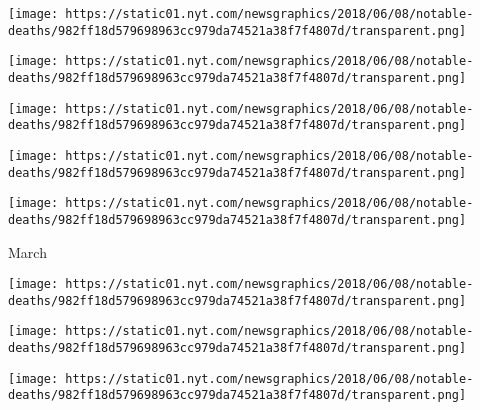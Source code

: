 \href{https://www.nytimes.com/2018/04/06/us/former-senator-daniel-akaka-dead.html}{}

\texttt{[image: https://static01.nyt.com/newsgraphics/2018/06/08/notable-deaths/982ff18d579698963cc979da74521a38f7f4807d/transparent.png]}

\href{https://www.nytimes.com/2018/04/05/obituaries/susan-anspach-75-dies-daring-actress-in-maverick-films.html}{}

\texttt{[image: https://static01.nyt.com/newsgraphics/2018/06/08/notable-deaths/982ff18d579698963cc979da74521a38f7f4807d/transparent.png]}

\href{https://www.nytimes.com/2018/04/05/obituaries/carl-scheib-youngest-player-in-american-league-history-dies-at-91.html}{}

\texttt{[image: https://static01.nyt.com/newsgraphics/2018/06/08/notable-deaths/982ff18d579698963cc979da74521a38f7f4807d/transparent.png]}

\href{https://www.nytimes.com/2018/04/02/world/africa/winnie-mandela-dead.html}{}

\texttt{[image: https://static01.nyt.com/newsgraphics/2018/06/08/notable-deaths/982ff18d579698963cc979da74521a38f7f4807d/transparent.png]}

\href{https://www.nytimes.com/2018/04/02/obituaries/steven-bochco-dead-tv-producer.html}{}

\texttt{[image: https://static01.nyt.com/newsgraphics/2018/06/08/notable-deaths/982ff18d579698963cc979da74521a38f7f4807d/transparent.png]}

March

\href{https://www.nytimes.com/2018/03/31/obituaries/samuel-belzberg-dead.html}{}

\texttt{[image: https://static01.nyt.com/newsgraphics/2018/06/08/notable-deaths/982ff18d579698963cc979da74521a38f7f4807d/transparent.png]}

\href{https://www.nytimes.com/2018/03/30/obituaries/andrew-balducci-who-turned-a-market-into-a-food-mecca-dies-at-92.html}{}

\texttt{[image: https://static01.nyt.com/newsgraphics/2018/06/08/notable-deaths/982ff18d579698963cc979da74521a38f7f4807d/transparent.png]}

\href{https://www.nytimes.com/2018/03/29/obituaries/rusty-staub-dead-baseball.html}{}

\texttt{[image: https://static01.nyt.com/newsgraphics/2018/06/08/notable-deaths/982ff18d579698963cc979da74521a38f7f4807d/transparent.png]}

